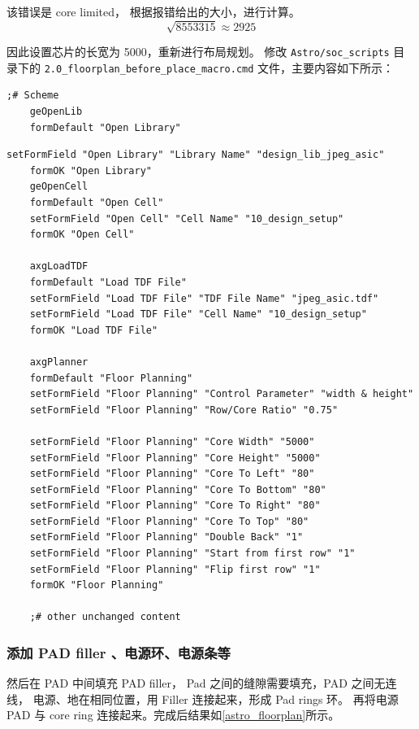 \documentclass[12pt,hyperref,a4paper,UTF8]{ctexart}
\begin{document}
该错误是 core limited， 根据报错给出的大小，进行计算。
\begin{equation}
    \sqrt{8553315} \approx 2925
\end{equation}

因此设置芯片的长宽为 5000，重新进行布局规划。
修改 \texttt{Astro/soc\_scripts} 目录下的 \texttt{2.0\_floorplan\_before\_place\_macro.cmd} 
文件，主要内容如下所示：
\begin{lstlisting}[style=tclstyle,name=2.0_floorplan_before_place_macro]
    ;# Scheme
    geOpenLib
    formDefault "Open Library"
\end{lstlisting}

\begin{lstlisting}[style=tclstyle,name=2.0_floorplan_before_place_macro]
    setFormField "Open Library" "Library Name" "design_lib_jpeg_asic"
    formOK "Open Library"
    geOpenCell
    formDefault "Open Cell"
    setFormField "Open Cell" "Cell Name" "10_design_setup"
    formOK "Open Cell"
    
    axgLoadTDF
    formDefault "Load TDF File"
    setFormField "Load TDF File" "TDF File Name" "jpeg_asic.tdf"
    setFormField "Load TDF File" "Cell Name" "10_design_setup"
    formOK "Load TDF File"
    
    axgPlanner
    formDefault "Floor Planning"
    setFormField "Floor Planning" "Control Parameter" "width & height"
    setFormField "Floor Planning" "Row/Core Ratio" "0.75"
    
    setFormField "Floor Planning" "Core Width" "5000"
    setFormField "Floor Planning" "Core Height" "5000"
    setFormField "Floor Planning" "Core To Left" "80"
    setFormField "Floor Planning" "Core To Bottom" "80"
    setFormField "Floor Planning" "Core To Right" "80"
    setFormField "Floor Planning" "Core To Top" "80"
    setFormField "Floor Planning" "Double Back" "1"
    setFormField "Floor Planning" "Start from first row" "1"
    setFormField "Floor Planning" "Flip first row" "1"
    formOK "Floor Planning"

    ;# other unchanged content
\end{lstlisting}
\subsubsection{添加 PAD filler 、电源环、电源条等}
然后在 PAD 中间填充 PAD filler， Pad 之间的缝隙需要填充，PAD 之间无连线，
电源、地在相同位置，用 Filler 连接起来，形成 Pad rings 环。
再将电源 PAD 与 core ring 连接起来。完成后结果如\autoref{astro_floorplan}所示。
\end{document}
